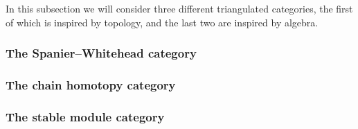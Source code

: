 In this subsection we will consider three different triangulated categories, the first of which is inspired by topology, and the last two are inspired by algebra.

\subsubsection{The Spanier--Whitehead category}
\label{subsubsection:spanier_whitehead_cat}


\subsubsection{The chain homotopy category}
\label{subsubsection:chain_homotopy_cat}


\subsubsection{The stable module category}
\label{subsubsection:stable_module_cat}
